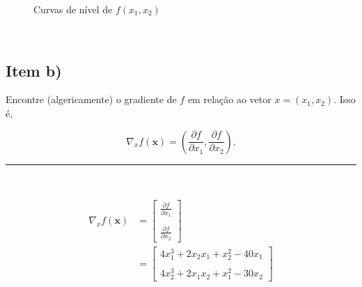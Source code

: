 \documentclass[
  a4paperpaper,
]{article}
\begin{document}
\begin{figure}[H]


\caption{\label{fig-q1a}Curvas de nível de \(f(x_1, x_2)\)}

\end{figure}%

~

\subsection{Item b)}\label{item-b}

Encontre (algericamente) o gradiente de \(f\) em relação ao vetor
\(x = (x_1 , x_2 )\). Isso é,

\[
\nabla_x f(\boldsymbol{x}) = \left( \frac{\partial f}{\partial x_1}, \frac{\partial f}{\partial x_2} \right).
\]

\begin{center}\rule{0.5\linewidth}{0.5pt}\end{center}

~

\begin{align}
 \nabla_x f(\boldsymbol{x}) &= 
    \begin{bmatrix} 
      \frac{\partial f}{\partial x_1} \\ \\
      \frac{\partial f}{\partial x_2} 
    \end{bmatrix} \nonumber \\
  &= \begin{bmatrix} 
        4x_1^3 + 2x_2x_1 + x_2^2 - 40x_1 \\ \\ 
        4x_2^3 + 2x_1x_2 + x_1^2 - 30x_2 
      \end{bmatrix}
\end{align}
\end{document}
